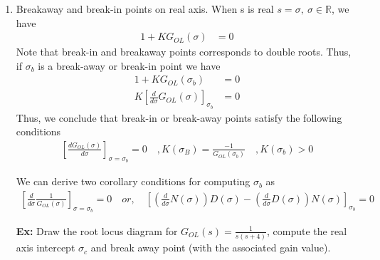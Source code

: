 \documentclass[twoside]{article}
\begin{document}
\begin{enumerate}
\item Breakaway and break-in points on real axis. When s is real 
$s = \sigma, \ \sigma \in \mathbb{R}$, we have
%
\begin{align*}
1 + K G_{OL} (\sigma) &= 0 
\end{align*}
%
Note that break-in and breakaway points corresponds to 
double roots. Thus, if $\sigma_{b}$ is a break-away or break-in 
point we have 
%
\begin{align*}
1 + K G_{OL} (\sigma_b) &= 0 
\\
K \left[ \frac{d}{d \sigma} G_{OL}(\sigma) \right]_{\sigma_b} &= 0
\end{align*}
%
Thus, we conclude that break-in or break-away points satisfy
the following conditions
%
%
\begin{align*}
\left[ \frac{d G_{OL}(\sigma)}{d \sigma} \right]_{\sigma = \sigma_b} = 0
\quad ,
K(\sigma_B) = \frac{-1}{G_{OL} (\sigma_b) }
\quad ,
K(\sigma_b) > 0
\end{align*}

We can derive two corollary conditions for computing $\sigma_b$ as
%
%
\begin{align*}
\left[ \frac{d}{d \sigma} \frac{1}{G_{OL}(\sigma)} \right]_{\sigma = \sigma_b} = 0
\quad or , \quad
\left[ \left( \frac{d}{d \sigma} N(\sigma) \right) D(\sigma)  -
\left( \frac{d}{d \sigma} D(\sigma) \right)  N(\sigma) \right]_{\sigma_b} = 0
\end{align*}

\newpage

\textbf{Ex:} Draw the root locus diagram for $G_{OL}(s) = \frac{1}{s (s+4)}$,
compute the real axis intercept $\sigma_c$ and break away point (with the associated gain value).


\end{enumerate}
\end{document}
